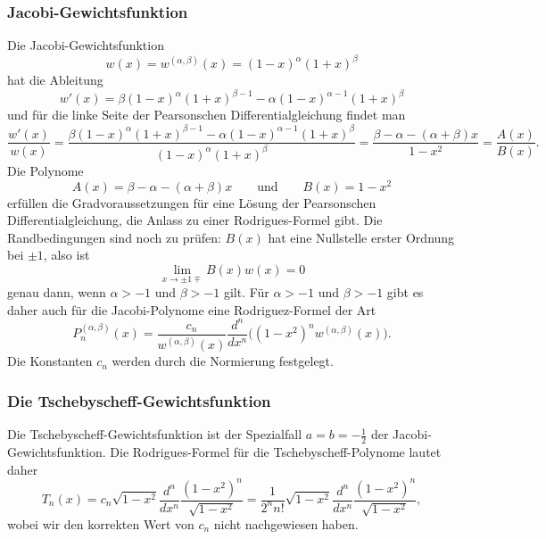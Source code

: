 \subsubsection{Jacobi-Gewichtsfunktion}
%
Die Jacobi-Gewichtsfunktion 
\[
w(x)
=
w^{(\alpha,\beta)}(x)
=
(1-x)^\alpha(1+x)^\beta
\]
hat die Ableitung
\[
w'(x)
=
\beta(1-x)^\alpha(1+x)^{\beta-1}-\alpha(1-x)^{\alpha-1}(1+x)^\beta
\]
und für die linke Seite der Pearsonschen Differentialgleichung findet man
\[
\frac{w'(x)}{w(x)}
=
\frac{
\beta(1-x)^\alpha(1+x)^{\beta-1}-\alpha(1-x)^{\alpha-1}(1+x)^\beta
}{
(1-x)^\alpha(1+x)^\beta
}
=
\frac{\beta-\alpha-(\alpha+\beta)x}{1-x^2}
=
\frac{A(x)}{B(x)}.
\]
Die Polynome
\[
A(x) = \beta-\alpha-(\alpha+\beta)x
\qquad\text{und}\qquad
B(x) = 1-x^2
\]
erfüllen die Gradvoraussetzungen für eine Lösung der Pearsonschen
Differentialgleichung, die Anlass zu einer Rodrigues-Formel gibt.
Die Randbedingungen sind noch zu prüfen: $B(x)$ hat eine Nullstelle
erster Ordnung bei $\pm1$, also ist
\[
\lim_{x\to \pm1\mp} B(x)w(x) = 0
\]
genau dann, wenn $\alpha>-1$ und $\beta>-1$ gilt.
Für $\alpha>-1$ und $\beta>-1$ gibt es daher auch für die Jacobi-Polynome
eine Rodriguez-Formel der Art
\[
P^{(\alpha,\beta)}_n(x)
=
\frac{c_n}{w^{(\alpha,\beta)}(x)}
\frac{d^n}{dx^n}
\bigl((1-x^2)^{n} w^{(\alpha,\beta)}(x)\bigr).
\]
Die Konstanten $c_n$ werden durch die Normierung
festgelegt.

\subsubsection{Die Tschebyscheff-Gewichtsfunktion}
Die Tschebyscheff-Gewichtsfunktion ist der Spezialfall $a=b=-\frac12$
der Jacobi-Gewichtsfunktion.
Die Rodrigues-Formel für die Tschebyscheff-Polynome lautet daher
\[
T_n(x)
=
c_n\sqrt{1-x^2} \frac{d^n}{dx^n}
\frac{(1-x^2)^n}{\sqrt{1-x^2}}
=
\frac{1}{2^nn!} \sqrt{1-x^2}
\frac{d^n}{dx^n} 
\frac{(1-x^2)^n}{\sqrt{1-x^2}},
\]
wobei wir den korrekten Wert von $c_n$ nicht nachgewiesen haben.

